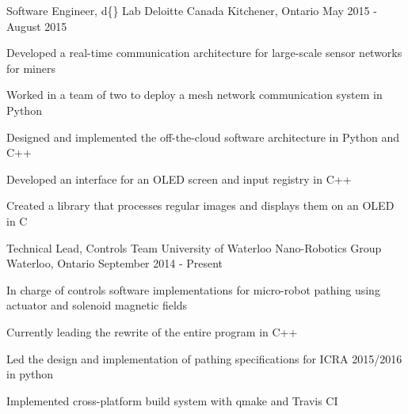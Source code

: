 \begin{cventries}

\cventry
{Software Engineer, d\{\} Lab}
{Deloitte Canada} %
{Kitchener, Ontario} %
{May 2015 - August 2015} %
{
Developed a real-time communication architecture for large-scale sensor networks for miners
\begin{cvitems}
\item[]
\item {Worked in a team of two to deploy a mesh network communication system in Python}
\item {Designed and implemented the off-the-cloud software architecture in Python and C++}
\item {Developed an interface for an OLED screen and input registry in C++}
\item {Created a library that processes regular images and displays them on an OLED in C}
\end{cvitems}
}


\cventry
{Technical Lead, Controls Team}
{University of Waterloo Nano-Robotics Group}
{Waterloo, Ontario}
{September 2014 - Present} %
{ %
In charge of controls software implementations for micro-robot pathing using actuator and solenoid magnetic fields
\begin{cvitems}
\item[]
\item {Currently leading the rewrite of the entire program in C++}
\item {Led the design and implementation of pathing specifications for ICRA 2015/2016 in python}
\item {Implemented cross-platform build system with qmake and Travis CI}
\end{cvitems} 
}


\end{cventries}
